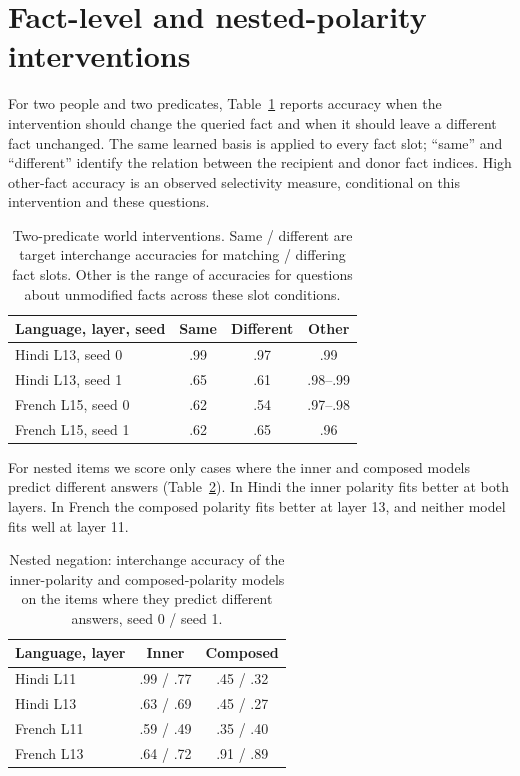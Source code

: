 \documentclass[11pt]{article}
\begin{document}
\section{Fact-level and nested-polarity interventions}
\label{app:worlds}
For two people and two predicates, Table~\ref{tab:worldseeds} reports accuracy when the intervention should change the queried fact and when it should leave a different fact unchanged. The same learned basis is applied to every fact slot; ``same'' and ``different'' identify the relation between the recipient and donor fact indices. High other-fact accuracy is an observed selectivity measure, conditional on this intervention and these questions.

\begin{table}[t]
\small\centering
\begin{tabularx}{\linewidth}{@{}Xccc@{}}
\toprule
Language, layer, seed & Same & Different & Other \\
\midrule
Hindi L13, seed 0 & .99 & .97 & .99 \\
Hindi L13, seed 1 & .65 & .61 & .98--.99 \\
French L15, seed 0 & .62 & .54 & .97--.98 \\
French L15, seed 1 & .62 & .65 & .96 \\
\bottomrule
\end{tabularx}
\caption{Two-predicate world interventions. Same / different are target interchange accuracies for matching / differing fact slots. Other is the range of accuracies for questions about unmodified facts across these slot conditions.}
\label{tab:worldseeds}
\end{table}

For nested items we score only cases where the inner and composed models predict different answers (Table~\ref{tab:nested}). In Hindi the inner polarity fits better at both layers. In French the composed polarity fits better at layer 13, and neither model fits well at layer 11.

\begin{table}[t]
\small\centering
\begin{tabularx}{\linewidth}{@{}Xcc@{}}
\toprule
Language, layer & Inner & Composed \\
\midrule
Hindi L11 & .99 / .77 & .45 / .32 \\
Hindi L13 & .63 / .69 & .45 / .27 \\
French L11 & .59 / .49 & .35 / .40 \\
French L13 & .64 / .72 & .91 / .89 \\
\bottomrule
\end{tabularx}
\caption{Nested negation: interchange accuracy of the inner-polarity and composed-polarity models on the items where they predict different answers, seed 0 / seed 1.}
\label{tab:nested}
\end{table}
\end{document}

